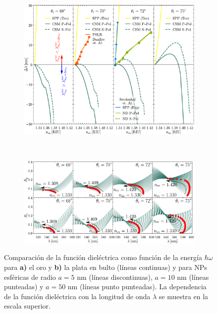 	\begin{figure}[h!]\centering\hspace*{-1.5em}
	\begin{subfigure}{.01\linewidth}\caption{}\label{sfig:sizeAu}\vspace{11cm}\end{subfigure}
	\begin{subfigure}{.95\linewidth}\hspace*{-1em}
	\includegraphics[width=\linewidth]{2-Resultados/figs/11-SPPCSM/1-comparacion_Au.pdf}
	\end{subfigure}\\ \hspace*{-1.5em}
	\begin{subfigure}{.01\linewidth}\caption{}\label{sfig:sizeAg}\vspace{6.5cm}\end{subfigure}
	\begin{subfigure}{.95\linewidth}\hspace*{-1em}
	\includegraphics[width=\linewidth]{2-Resultados/figs/11-SPPCSM/2-RpRs}
	\end{subfigure}\vspace*{-.7em}
	\caption{ Comparación de la función dieléctrica como función de la energía $\hbar\omega$ para \textbf{a)} el   oro y \textbf{b)} la plata en bulto (líneas continuas) y para NPs esféricas de radio $a=5$ nm (líneas discontinuas), $a=10$ nm (líneas punteadas) y $a=50$ nm (líneas punto punteadas). La dependencia de la función dieléctrica con la longitud de onda $\lambda$ se muestra en la escala superior.}\label{fig:sizeCorrection}
	\end{figure}	



